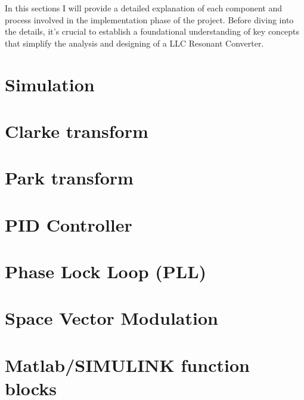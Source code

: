 In this sections I will provide a detailed explanation of each component and
process involved in the implementation phase of the project. Before diving into
the details, it's crucial to establish a foundational understanding of key
concepts that simplify the analysis and designing of a LLC Resonant Converter.

\section{Simulation}

\section{Clarke transform}

\section{Park transform}

\section{PID Controller}

\section{Phase Lock Loop (PLL)}

\section{Space Vector Modulation}

\section{Matlab/SIMULINK function blocks}

